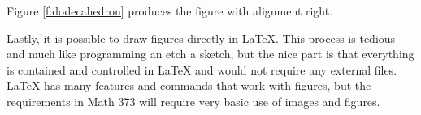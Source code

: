 \documentclass{article}
\begin{document}
Figure \ref{f:dodecahedron} produces the figure with alignment right. 

\medskip 

Lastly, it is possible to draw figures directly in LaTeX. This process is tedious and much like programming an etch a sketch, but the nice part is that everything is contained and controlled in LaTeX and would not require any external files. LaTeX has many features and commands that work with figures, but the requirements in Math 373 will require very basic use of images and figures.

\end{document}
